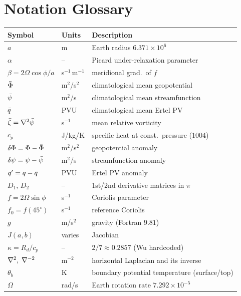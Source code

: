 \chapter{Notation Glossary}
\label{app:notation}

\begin{longtable}{lll}
  \toprule
  Symbol & Units & Description \\
  \midrule\endhead
  $a$                  & m            & Earth radius $6.371\times 10^{6}$ \\
  $\alpha$             & --           & Picard under-relaxation parameter \\
  $\beta=2\Omega\cos\phi/a$ & s$^{-1}$\,m$^{-1}$ & meridional grad.\ of $f$ \\
  $\bar{\Phi}$              & m$^2$/s$^2$  & climatological mean geopotential \\
  $\bar{\psi}$              & m$^2$/s      & climatological mean streamfunction \\
  $\bar{q}$                & PVU          & climatological mean Ertel PV \\
  $\bar{\zeta}=\nabla^{2}\bar{\psi}$   & s$^{-1}$     & mean relative vorticity \\
  $c_p$                & J/kg/K       & specific heat at const.\ pressure (1004) \\
  $\delta\Phi=\Phi-\bar{\Phi}$   & m$^2$/s$^2$  & geopotential anomaly \\
  $\delta\psi=\psi-\bar{\psi}$   & m$^2$/s      & streamfunction anomaly \\
  $q^{\prime}=q-\bar{q}$          & PVU          & Ertel PV anomaly \\
  $D_1,\,D_2$          & --           & 1st/2nd derivative matrices in $\pi$ \\
  $f=2\Omega\sin\phi$  & s$^{-1}$     & Coriolis parameter \\
  $f_0=f(45^\circ)$    & s$^{-1}$     & reference Coriolis \\
  $g$                  & m/s$^2$      & gravity (Fortran $9.81$) \\
  $J(a,b)$             & varies       & Jacobian \\
  $\kappa=R_d/c_p$     & --           & $2/7\approx 0.2857$ (Wu hardcoded) \\
  $\nabla^{2},\;\nabla^{-2}$     & m$^{-2}$     & horizontal Laplacian and its inverse \\
  $\theta_b$           & K            & boundary potential temperature (surface/top) \\
  $\Omega$             & rad/s        & Earth rotation rate $7.292\times10^{-5}$ \\

\end{longtable}
